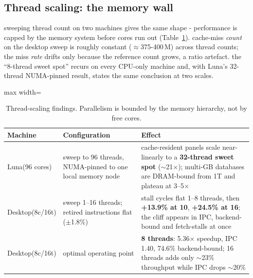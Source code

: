 \documentclass[10.5pt]{article}
\begin{document}
\subsection{Thread scaling: the memory wall}
sweeping thread count on two machines gives the same shape - performance is capped by the memory system before cores run out (Table~\ref{tab:threads}). cache-miss \textit{count} on the desktop sweep is roughly constant ($\approx$375-400\,M) across thread counts; the miss \textit{rate} drifts only because the reference count grows, a ratio artefact. the ``8-thread sweet spot'' recurs on every CPU-only machine and, with Luna's 32-thread NUMA-pinned result, states the same conclusion at two scales.

\begin{table}[h!]
\centering\footnotesize
\caption{Thread-scaling findings. Parallelism is bounded by the memory hierarchy, not by free cores.}
\label{tab:threads}
\begin{adjustbox}{max width=\textwidth}
\begin{tabular}{@{}p{2.0cm}p{5.9cm}p{6.6cm}@{}}
\toprule
\textbf{Machine} & \textbf{Configuration} & \textbf{Effect} \\
\midrule
Luna\newline (96 cores) & sweep to 96 threads, NUMA-pinned to one local memory node & cache-resident panels scale near-linearly to a \textbf{32-thread sweet spot} ($\sim$21$\times$); multi-GB databases are DRAM-bound from 1T and plateau at 3--5$\times$ \\
Desktop\newline (8c/16t) & sweep 1--16 threads; retired instructions flat ($\pm$1.8\%) & stall cycles flat 1--8 threads, then \textbf{+13.9\% at 10}, \textbf{+24.5\% at 16}; the cliff appears in IPC, backend-bound and fetch-stalls at once \\
Desktop\newline (8c/16t) & optimal operating point & \textbf{8 threads}: 5.36$\times$ speedup, IPC 1.40, 74.6\% backend-bound; 16 threads adds only $\sim$23\% throughput while IPC drops $\sim$20\% \\
\bottomrule
\end{tabular}
\end{adjustbox}
\end{table}
\end{document}
